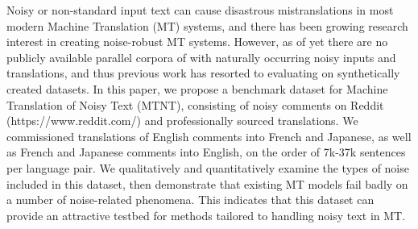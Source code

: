 Noisy or non-standard input text can cause disastrous mistranslations in most modern Machine Translation (MT) systems, and there has been growing research interest in creating noise-robust MT systems. However, as of yet there are no publicly available parallel corpora of with naturally occurring noisy inputs and translations, and thus previous work has resorted to evaluating on synthetically created datasets. In this paper, we propose a benchmark dataset for Machine Translation of Noisy Text (MTNT), consisting of noisy comments on Reddit (https://www.reddit.com/) and professionally sourced translations. We commissioned translations of English comments into French and Japanese, as well as French and Japanese comments into English, on the order of 7k-37k sentences per language pair. We qualitatively and quantitatively examine the types of noise included in this dataset, then demonstrate that existing MT models fail badly on a number of noise-related phenomena. This indicates that this dataset can provide an attractive testbed for methods tailored to handling noisy text in MT.

